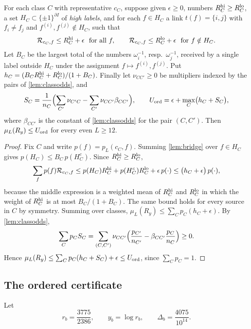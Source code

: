 \begin{proposition}\label{prop:cap}
For each class $C$ with representative $c_C$, suppose given $\epsilon\ge0$, numbers $R^{\rm hi}_C\ge R^{\rm lo}_C$, a set $H_C\subset\{\pm1\}^{\partial I}$ of \emph{high labels}, and for each $f\in H_C$ a link $t(f)=\{i,j\}$ with $f_i\ne f_j$ and $f^{(i)},f^{(j)}\notin H_C$, such that
\[
 \mathcal R_{c_C,f}\le R^{\rm hi}_C+\epsilon\ \ \text{for all }f,\qquad
 \mathcal R_{c_C,f}\le R^{\rm lo}_C+\epsilon\ \ \text{for }f\notin H_C .
\]
Let $B_C$ be the largest total of the numbers $\omega_i^{-1}$, resp.\ $\omega_j^{-1}$, received by a single label outside $H_C$ under the assignment $f\mapsto f^{(i)},f^{(j)}$. Put $h_C=(B_CR^{\rm hi}_C+R^{\rm lo}_C)/(1+B_C)$. Finally let $\nu_{CC'}\ge0$ be multipliers indexed by the pairs of \cref{lem:classodds}, and
\begin{equation}\label{eq:Sclass}
 S_C=\frac1{n_C}\Bigl(\sum_{C'}\nu_{C'C}-\sum_{C'}\nu_{CC'}\beta_{CC'}\Bigr),\qquad
 U_{\mathrm{ord}}=\epsilon+\max_C\bigl(h_C+S_C\bigr),
\end{equation}
where $\beta_{CC'}$ is the constant of \cref{lem:classodds} for the pair $(C,C')$. Then $\mu_L(R_y)\le U_{\mathrm{ord}}$ for every even $L\ge12$.
\end{proposition}

\begin{proof}
Fix $C$ and write $p(f)=p_L(c_C,f)$. Summing \cref{lem:bridge} over $f\in H_C$ gives $p(H_C)\le B_C\,p(H_C^c)$. Since $R^{\rm hi}_C\ge R^{\rm lo}_C$,
\[
 \sum_fp(f)\mathcal R_{c_C,f}\le p(H_C)R^{\rm hi}_C+p(H_C^c)R^{\rm lo}_C+\epsilon\,p(\cdot)
 \le\bigl(h_C+\epsilon\bigr)\,p(\cdot),
\]
because the middle expression is a weighted mean of $R^{\rm hi}_C$ and $R^{\rm lo}_C$ in which the weight of $R^{\rm hi}_C$ is at most $B_C/(1+B_C)$. The same bound holds for every source in $C$ by symmetry. Summing over classes, $\mu_L(R_y)\le\sum_Cp_C(h_C+\epsilon)$. By \cref{lem:classodds},
\[
 \sum_Cp_CS_C=\sum_{(C,C')}\nu_{CC'}\Bigl(\frac{p_{C'}}{n_{C'}}-\beta_{CC'}\frac{p_C}{n_C}\Bigr)\ge0 .
\]
Hence $\mu_L(R_y)\le\sum_Cp_C(h_C+S_C)+\epsilon\le U_{\mathrm{ord}}$, since $\sum_Cp_C=1$.
\end{proof}

\subsection{The ordered certificate}

Let
\[
 r_b=\frac{3775}{2386},\qquad y_b=\log r_b,\qquad \Delta_b=\frac{4075}{10^{14}} .
\]

